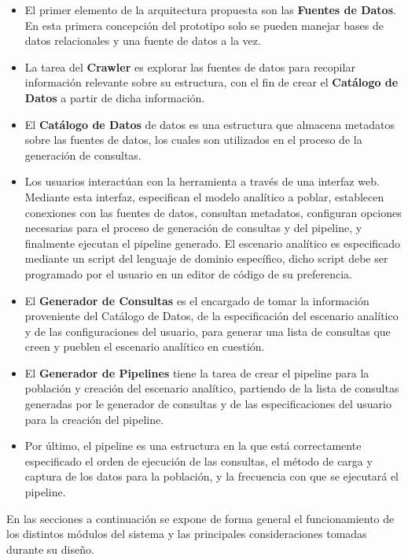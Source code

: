 \begin{itemize}
    \item El primer elemento de la arquitectura propuesta son las \textbf{Fuentes de Datos}. En esta primera concepción del 
        prototipo solo se pueden manejar bases de datos relacionales y una fuente de datos a la vez.
    \item La tarea del \textbf{Crawler} es explorar las fuentes de datos para recopilar información relevante sobre su estructura, 
        con el fin de crear el \textbf{Catálogo de Datos} a partir de dicha información.
    \item El \textbf{Catálogo de Datos} de datos es una estructura que almacena metadatos sobre las fuentes de datos, los cuales son 
        utilizados en el proceso de la generaci\'on de consultas.
    \item Los usuarios interactúan con la herramienta a través de una interfaz web. Mediante esta interfaz, especifican el modelo 
        analítico a poblar, establecen conexiones con las fuentes de datos, consultan metadatos, configuran opciones necesarias 
        para el proceso de generación de consultas y del pipeline, y finalmente ejecutan el pipeline generado. El escenario analítico 
        es especificado mediante un script del lenguaje de dominio espec\'ifico, dicho script debe ser programado por el usuario en 
        un editor de c\'odigo de su preferencia.
    \item El \textbf{Generador de Consultas} es el encargado de tomar la información proveniente del Catálogo de Datos, de la especificaci\'on
        del escenario analítico y de las configuraciones del usuario, para generar una lista de consultas que creen y pueblen el escenario 
        analítico en cuesti\'on.
    \item El \textbf{Generador de Pipelines} tiene la tarea de crear el pipeline para la población y creaci\'on del escenario analítico, partiendo 
        de la lista de consultas generadas por le generador de consultas y de las especificaciones del usuario para la creaci\'on del pipeline.
    \item Por \'ultimo, el pipeline es una estructura en la que est\'a correctamente especificado el orden de ejecuci\'on de las consultas, 
        el m\'etodo de carga y captura de los datos para la población, y la frecuencia con que se ejecutar\'a el pipeline.
\end{itemize}

En las secciones a continuación se expone de forma general el funcionamiento de
los distintos módulos del sistema y las principales consideraciones tomadas durante
su diseño.

